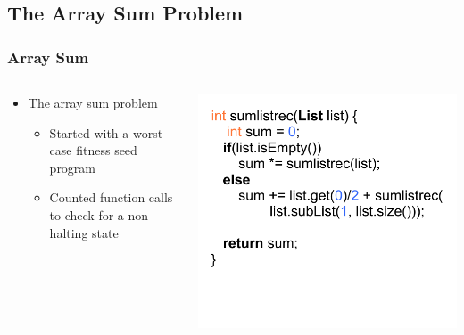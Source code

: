 \documentclass{beamer}
\begin{document}
\subsection[The Array Sum Problem]{The Array Sum Problem}

\begin{frame}
\frametitle{Array Sum}
\begin{columns}[T]
\begin{column}{0.5\textwidth}
\begin{itemize}
\item The array sum problem
\\
\begin{itemize}
\item Started with a worst case fitness seed program
\item Counted function calls to check for a non-halting state
\end{itemize}

\end{itemize}
\end{column}
\begin{column}{0.5\textwidth}
\includegraphics[height=.65\textheight]{Illustrations/seedRec.pdf}
\end{column}
\end{columns}
\end{frame}
\end{document}
